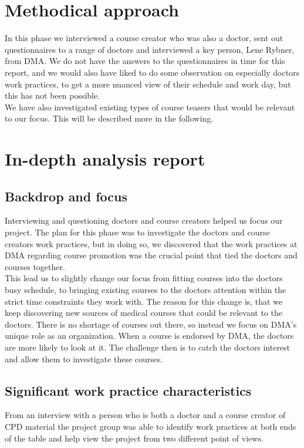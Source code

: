 \section{Methodical approach}
In this phase we interviewed a course creator who was also a doctor, sent out questionnaires to a range of doctors and interviewed a key person, Lene Rybner, from DMA. We do not have the answers to the questionnaires in time for this report, and we would also have liked to do some observation on especially doctors work practices, to get a more nuanced view of their schedule and work day, but this has not been possible.\\
We have also investigated existing types of course teasers that would be relevant to our focus. This will be described more in the following.

\section{In-depth analysis report}

\subsection{Backdrop and focus}
Interviewing and questioning doctors and course creators helped us focus our project. The plan for this phase was to investigate the doctors and course creators work practices, but in doing so, we discovered that the work practices at DMA regarding course promotion was the crucial point that tied the doctors and courses together.\\
This lead us to slightly change our focus from fitting courses into the doctors busy schedule, to bringing existing courses to the doctors attention within the strict time constraints they work with.
The reason for this change is, that we keep discovering new sources of medical courses that could be relevant to the doctors. There is no shortage of courses out there, so instead we focus on DMA’s unique role as an organization. When a course is endorsed by DMA, the doctors are more likely to look at it. The challenge then is to catch the doctors interest and allow them to investigate these courses.

\subsection{Significant work practice characteristics}
From an interview with a person who is both a doctor and a course creator of CPD material the project group was able to identify work practices at both ends of the table and help view the project from two different point of views.

